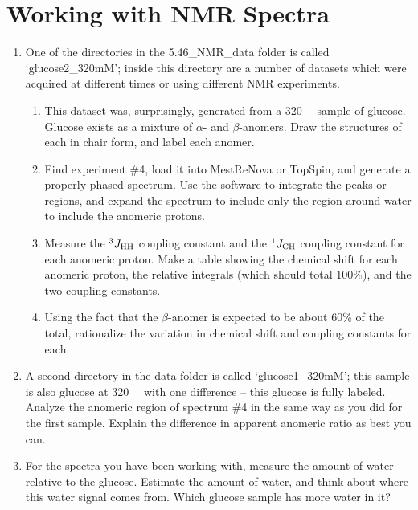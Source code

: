 \documentclass[../psets.tex]{subfiles}
\begin{document}
\section{Working with NMR Spectra}
\begin{enumerate}
    \item {}One of the directories in the 5.46\_NMR\_data folder is called `glucose2\_320mM'; inside this directory are a number of datasets which were acquired at different times or using different NMR experiments.
    \begin{enumerate}
        \item This dataset was, surprisingly, generated from a \SI{320}{\milli\molar} sample of glucose. Glucose exists as a mixture of $\alpha$- and $\beta$-anomers. Draw the structures of each in chair form, and label each anomer.
        \item Find experiment \#4, load it into MestReNova or TopSpin, and generate a properly phased spectrum. Use the software to integrate the peaks or regions, and expand the spectrum to include only the region around water to include the anomeric protons.
        \item Measure the ${}^3J_{\ce{HH}}$ coupling constant and the ${}^1J_{\ce{CH}}$ coupling constant for each anomeric proton. Make a table showing the chemical shift for each anomeric proton, the relative integrals (which should total 100\%), and the two coupling constants.
        \item Using the fact that the $\beta$-anomer is expected to be about 60\% of the total, rationalize the variation in chemical shift and coupling constants for each.
    \end{enumerate}
    \item A second directory in the data folder is called `glucose1\_320mM'; this sample is also glucose at \SI{320}{\milli\molar} with one difference -- this glucose is fully  labeled. Analyze the anomeric region of spectrum \#4 in the same way as you did for the first sample. Explain the difference in apparent anomeric ratio as best you can.
    \item For the spectra you have been working with, measure the amount of water relative to the glucose. Estimate the amount of water, and think about where this water signal comes from. Which glucose sample has more water in it?
\end{enumerate}
\end{document}
